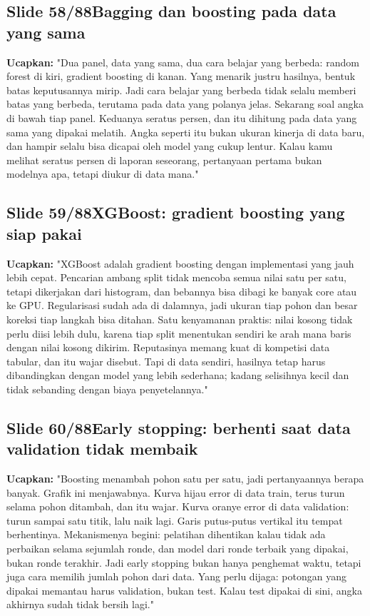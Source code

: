 \documentclass[11pt]{article}
\renewcommand{\framebox}[1]{\colorbox{acc!15}{\textcolor{acc}{\textbf{#1}}}}
\begin{document}
\subsection*{\framebox{Slide 58/88}\quad Bagging dan boosting pada data yang sama}
\textbf{Ucapkan:} "Dua panel, data yang sama, dua cara belajar yang berbeda: random forest di kiri, gradient boosting di kanan. Yang menarik justru hasilnya, bentuk batas keputusannya mirip. Jadi cara belajar yang berbeda tidak selalu memberi batas yang berbeda, terutama pada data yang polanya jelas. Sekarang soal angka di bawah tiap panel. Keduanya seratus persen, dan itu dihitung pada data yang sama yang dipakai melatih. Angka seperti itu bukan ukuran kinerja di data baru, dan hampir selalu bisa dicapai oleh model yang cukup lentur. Kalau kamu melihat seratus persen di laporan seseorang, pertanyaan pertama bukan modelnya apa, tetapi diukur di data mana."\\[2pt]

\subsection*{\framebox{Slide 59/88}\quad XGBoost: gradient boosting yang siap pakai}
\textbf{Ucapkan:} "XGBoost adalah gradient boosting dengan implementasi yang jauh lebih cepat. Pencarian ambang split tidak mencoba semua nilai satu per satu, tetapi dikerjakan dari histogram, dan bebannya bisa dibagi ke banyak core atau ke GPU. Regularisasi sudah ada di dalamnya, jadi ukuran tiap pohon dan besar koreksi tiap langkah bisa ditahan. Satu kenyamanan praktis: nilai kosong tidak perlu diisi lebih dulu, karena tiap split menentukan sendiri ke arah mana baris dengan nilai kosong dikirim. Reputasinya memang kuat di kompetisi data tabular, dan itu wajar disebut. Tapi di data sendiri, hasilnya tetap harus dibandingkan dengan model yang lebih sederhana; kadang selisihnya kecil dan tidak sebanding dengan biaya penyetelannya."\\[2pt]

\subsection*{\framebox{Slide 60/88}\quad Early stopping: berhenti saat data validation tidak membaik}
\textbf{Ucapkan:} "Boosting menambah pohon satu per satu, jadi pertanyaannya berapa banyak. Grafik ini menjawabnya. Kurva hijau error di data train, terus turun selama pohon ditambah, dan itu wajar. Kurva oranye error di data validation: turun sampai satu titik, lalu naik lagi. Garis putus-putus vertikal itu tempat berhentinya. Mekanismenya begini: pelatihan dihentikan kalau tidak ada perbaikan selama sejumlah ronde, dan model dari ronde terbaik yang dipakai, bukan ronde terakhir. Jadi early stopping bukan hanya penghemat waktu, tetapi juga cara memilih jumlah pohon dari data. Yang perlu dijaga: potongan yang dipakai memantau harus validation, bukan test. Kalau test dipakai di sini, angka akhirnya sudah tidak bersih lagi."\\[2pt]
\end{document}
